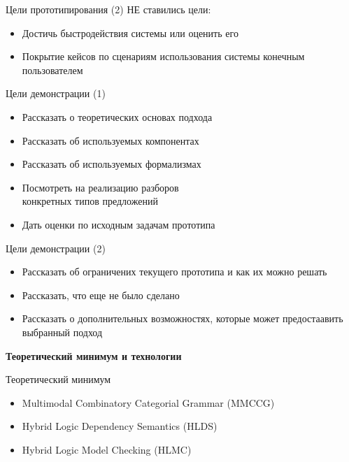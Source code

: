 \documentclass{beamer}
\begin{document}
\begin{frame}{Цели прототипирования (2)}
НЕ ставились цели:\\
\bigskip
\begin{itemize}
	\item Достичь быстродействия системы или оценить его
	\item Покрытие кейсов по сценариям использования системы конечным пользователем
\end{itemize}
\end{frame}

\begin{frame}{Цели демонстрации (1)}
\begin{itemize}
	\item Рассказать о теоретических основах подхода
	\item Рассказать об используемых компонентах
	\item Рассказать об используемых формализмах
	\item Посмотреть на реализацию разборов \\конкретных типов предложений
	\item Дать оценки по исходным задачам прототипа
\end{itemize}
\end{frame}

\begin{frame}{Цели демонстрации (2)}
\begin{itemize}
	\item Рассказать об ограничених текущего прототипа и как их можно решать
	\item Рассказать, что еще не было сделано
	\item Рассказать о дополнительных возможностях, которые может предостаавить выбранный подход
\end{itemize}
\end{frame}


\begin{frame}{}
\begin{center}
	\textbf{Теоретический минимум и технологии}\\
\end{center}
\end{frame}


\begin{frame}{Теоретический минимум}
\begin{itemize}
	\item Multimodal Combinatory Categorial Grammar (MMCCG)
	\item Hybrid Logic Dependency Semantics (HLDS)
	\item Hybrid Logic Model Checking (HLMC)
\end{itemize}
\end{frame}
\end{document}

